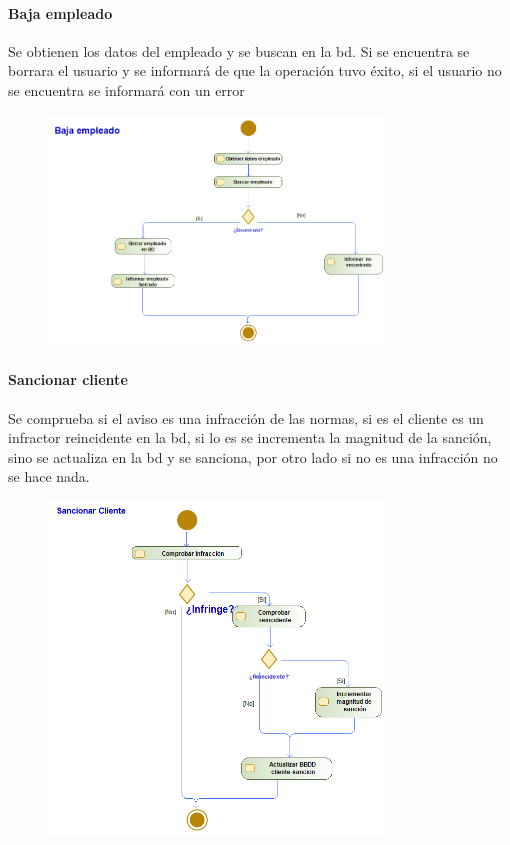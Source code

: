 \paragraph{Baja empleado}
Se obtienen los datos del empleado y se buscan en la \gls{bd}. Si se encuentra se borrara el usuario y se informará de que la operación tuvo éxito, si el usuario no se encuentra se informará con un error
\begin{figure}[H]
    \centering
    \includegraphics[width=0.8\textwidth]{Use_Cases/Baja empleado.png}
\end{figure}
\newpage
\paragraph{Sancionar cliente}
Se comprueba si el aviso es una infracción de las normas, si es el cliente es un infractor reincidente en la \gls{bd}, si lo es se incrementa la magnitud de la sanción, sino se actualiza en la \gls{bd} y se sanciona, por otro lado si no es una infracción no se hace nada.
\begin{figure}[H]
    \centering
    \includegraphics[width=0.8\textwidth]{Use_Cases/Sancionar Cliente.png}
\end{figure}
\newpage
